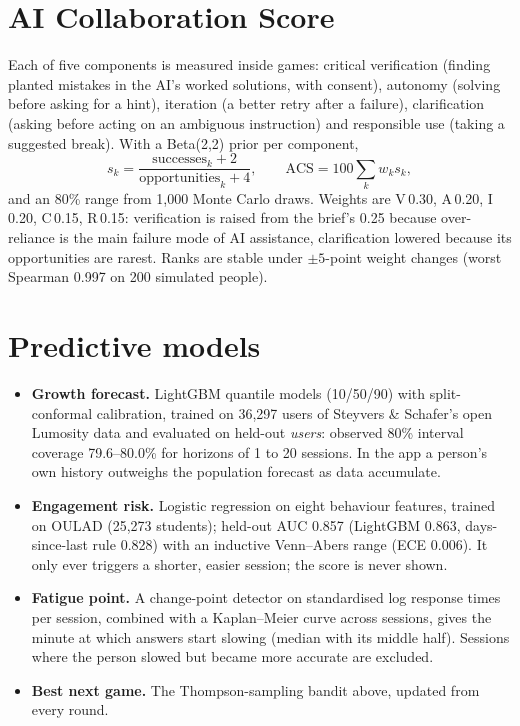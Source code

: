 \documentclass[10pt,a4paper]{article}
\begin{document}
\section{AI Collaboration Score}
Each of five components is measured inside games: critical verification (finding planted mistakes
in the AI's worked solutions, with consent), autonomy (solving before asking for a hint), iteration
(a better retry after a failure), clarification (asking before acting on an ambiguous instruction)
and responsible use (taking a suggested break). With a Beta(2,2) prior per component,
\[
s_k=\frac{\text{successes}_k+2}{\text{opportunities}_k+4},\qquad
\text{ACS}=100\sum_k w_k s_k,
\]
and an 80\% range from 1{,}000 Monte Carlo draws. Weights are V\,0.30, A\,0.20, I\,0.20, C\,0.15,
R\,0.15: verification is raised from the brief's 0.25 because over-reliance is the main failure mode
of AI assistance, clarification lowered because its opportunities are rarest. Ranks are stable under
$\pm5$-point weight changes (worst Spearman 0.997 on 200 simulated people).

\section{Predictive models}
\begin{itemize}
\item \textbf{Growth forecast.} LightGBM quantile models (10/50/90) with split-conformal calibration,
trained on 36{,}297 users of Steyvers \& Schafer's open Lumosity data and evaluated on held-out
\emph{users}: observed 80\% interval coverage 79.6--80.0\% for horizons of 1 to 20 sessions. In the app a
person's own history outweighs the population forecast as data accumulate.
\item \textbf{Engagement risk.} Logistic regression on eight behaviour features, trained on OULAD
(25{,}273 students); held-out AUC 0.857 (LightGBM 0.863, days-since-last rule 0.828) with an inductive
Venn--Abers range (ECE 0.006). It only ever triggers a shorter, easier session; the score is never shown.
\item \textbf{Fatigue point.} A change-point detector on standardised log response times per session,
combined with a Kaplan--Meier curve across sessions, gives the minute at which answers start slowing
(median with its middle half). Sessions where the person slowed but became more accurate are excluded.
\item \textbf{Best next game.} The Thompson-sampling bandit above, updated from every round.
\end{itemize}
\end{document}
